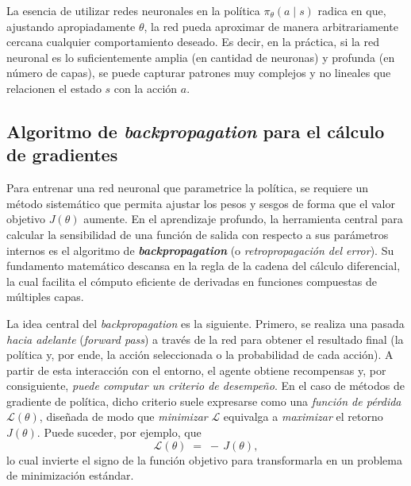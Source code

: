 \documentclass[11pt,a4paper,spanish]{article}
\numberwithin{equation}{section} %
\begin{document}
La esencia de utilizar redes neuronales en la política \(\pi_\theta(a \mid s)\) radica en que, ajustando apropiadamente \(\theta\), la red pueda aproximar de manera arbitrariamente cercana cualquier comportamiento deseado. Es decir, en la práctica, si la red neuronal es lo suficientemente amplia (en cantidad de neuronas) y profunda (en número de capas), se puede capturar patrones muy complejos y no lineales que relacionen el estado \(s\) con la acción \(a\). 

\medskip

\subsection{Algoritmo de \textit{backpropagation} para el cálculo de gradientes}
\label{subsubsec:backpropagation}

Para entrenar una red neuronal que parametrice la política, se requiere un método sistemático que permita ajustar los pesos y sesgos de forma que el valor objetivo \(J(\theta)\) aumente. En el aprendizaje profundo, la herramienta central para calcular la sensibilidad de una función de salida con respecto a sus parámetros internos es el algoritmo de \textbf{\textit{backpropagation}} (o \emph{retropropagación del error}). Su fundamento matemático descansa en la regla de la cadena del cálculo diferencial, la cual facilita el cómputo eficiente de derivadas en funciones compuestas de múltiples capas.

La idea central del \textit{backpropagation} es la siguiente. Primero, se realiza una pasada \textit{hacia adelante} (\textit{forward pass}) a través de la red para obtener el resultado final (la política y, por ende, la acción seleccionada o la probabilidad de cada acción). A partir de esta interacción con el entorno, el agente obtiene recompensas y, por consiguiente, \emph{puede computar un criterio de desempeño}. En el caso de métodos de gradiente de política, dicho criterio suele expresarse como una \emph{función de pérdida} \(\mathcal{L}(\theta)\), diseñada de modo que \emph{minimizar} \(\mathcal{L}\) equivalga a \emph{maximizar} el retorno \(J(\theta)\). Puede suceder, por ejemplo, que
\[
\mathcal{L}(\theta) \;=\; -\,J(\theta),
\]
lo cual invierte el signo de la función objetivo para transformarla en un problema de minimización estándar.
\end{document}
